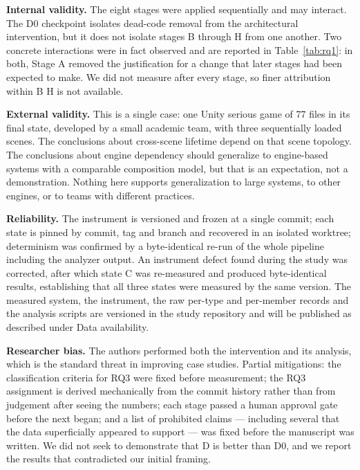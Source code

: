\documentclass{sbc2019}%
\begin{document}
\medskip\noindent\textbf{Internal validity.} The eight stages were applied
sequentially and may interact. The D0 checkpoint isolates dead-code removal from
the architectural intervention, but it does not isolate stages B through H from
one another. Two concrete interactions were in fact observed and are reported in
Table~\ref{tab:rq1}: in both, Stage A removed the justification for a change
that later stages had been expected to make. We did not measure after every
stage, so finer attribution within B\textendash{} H is not available.

\medskip\noindent\textbf{External validity.} This is a single case: one
Unity serious game of 77 files in its final state, developed by a small academic
team, with three sequentially loaded scenes. The conclusions about cross-scene
lifetime depend on that scene topology. The conclusions about engine dependency
should generalize to engine-based systems with a comparable composition model,
but that is an expectation, not a demonstration. Nothing here supports
generalization to large systems, to other engines, or to teams with different
practices.

\medskip\noindent\textbf{Reliability.} The instrument is versioned and frozen at
a single commit; each state is pinned by commit, tag and branch and recovered in
an isolated worktree; determinism was confirmed by a byte-identical re-run of the
whole pipeline including the analyzer output. An instrument defect found during
the study was corrected, after which state C was re-measured and produced
byte-identical results, establishing that all three states were measured by the
same version. The measured system, the instrument, the raw per-type and
per-member records and the analysis scripts are versioned in the study
repository and will be published as described under Data availability.

\medskip\noindent\textbf{Researcher bias.} The authors performed both the
intervention and its analysis, which is the standard threat in improving case
studies. Partial mitigations: the classification criteria for RQ3 were fixed
before measurement; the RQ3 assignment is derived mechanically from the commit
history rather than from judgement after seeing the numbers; each stage passed a
human approval gate before the next began; and a list of prohibited claims ---
including several that the data superficially appeared to support --- was fixed
before the manuscript was written. We did not seek to demonstrate that D is
better than D0, and we report the results that contradicted our initial framing.
\end{document}

